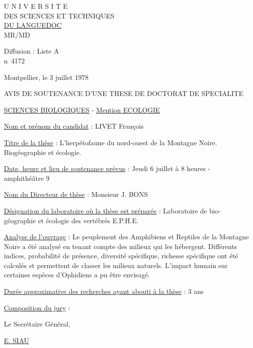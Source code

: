 \begin{center}
U N I V E R S I T E\\
DES SCIENCES ET TECHNIQUES\\
\uline{DU LANGUEDOC}\\
MR/MD
\end{center}
Diffusion : Liste A\\
n\textdegree\ 4172

Montpellier, le 3 juillet 1978

\begin{center}
AVIS DE SOUTENANCE D'UNE THESE DE DOCTORAT DE SPECIALITE

\uline{SCIENCES BIOLOGIQUES} - \uline{Mention ECOLOGIE}
\end{center}

\uline{Nom et prénom du candidat} : LIVET François

\uline{Titre de la thèse} : L'herpétofaune du nord-ouest de la Montagne Noire.
Biogéographie et écologie.

\uline{Date, heure et lieu de soutenance prévus} : Jeudi 6 juillet à 8 heures -
amphithéâtre 9

\uline{Nom du Directeur de thèse} : Monsieur J. BONS

\uline{Désignation du laboratoire où la thèse est préparée} : Laboratoire de bio-\\
géographie et écologie des vertébrés E.P.H.E.

\uline{Analyse de l'ouvrage} : Le peuplement des Amphibiens et Reptiles de la Montagne
Noire a été analysé en tenant compte des milieux qui les hébergent.
Différents indices, probabilité de présence, diversité spécifique, richesse
spécifique ont été calculés et permettent de classer les milieux naturels.
L'impact humain sur certaines espèces d'Ophidiens a pu être envisagé.

\uline{Durée approximative des recherches ayant abouti à la thèse} : 3 ans

\uline{Composition du jury} :

Le Secrétaire Général,


\uline{E. SIAU}

